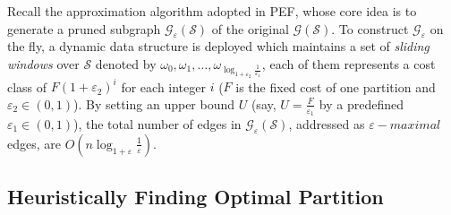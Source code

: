 \documentclass[runningheads,a4paper]{llncs}
\begin{document}
Recall the approximation algorithm adopted in PEF, whose core idea is to generate a pruned subgraph $\mathcal{G}_{\varepsilon}\left(\mathcal{S}\right)$ of the original $\mathcal{G}\left(\mathcal{S}\right)$.
To construct $\mathcal{G}_{\varepsilon}$ on the fly, a dynamic data structure is deployed which maintains a set of \textit{sliding windows} over $\mathcal{S}$ denoted by $\omega_{0},\omega_{1},\dots, \omega_{\log_{1+\varepsilon_2}\frac{1}{\varepsilon_1}}$, each of them represents a cost class of $F\left(1+\varepsilon_2\right)^{i}$ for each integer $i$ ($F$ is the fixed cost of one partition and $\varepsilon_{2}\in\left(0,1\right)$).
By setting an upper bound $U$ (say, $U=\frac{F}{\varepsilon_{1}}$ by a predefined $\varepsilon_{1}\in\left(0,1\right)$), the total number of edges in $\mathcal{G}_{\varepsilon}\left(\mathcal{S}\right)$, addressed as $\varepsilon-maximal$ edges, are $O\left(n\log_{1+\varepsilon}\frac{1}{\varepsilon}\right)$.


\subsection{Heuristically Finding Optimal Partition}
\end{document}
